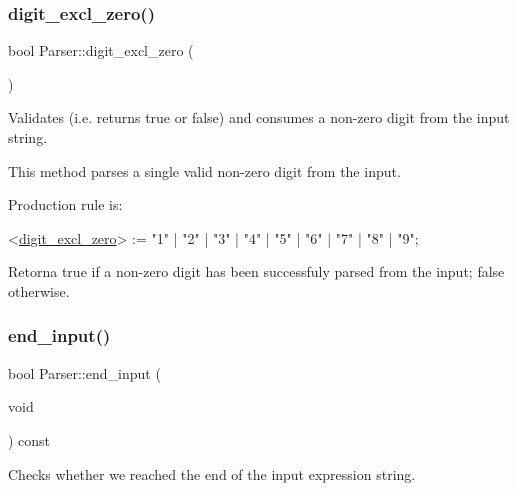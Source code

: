 \subsubsection{\texorpdfstring{digit\+\_\+excl\+\_\+zero()}{digit\_excl\_zero()}}
{\footnotesize\ttfamily bool Parser\+::digit\+\_\+excl\+\_\+zero (\begin{DoxyParamCaption}{ }\end{DoxyParamCaption})\hspace{0.3cm}{\ttfamily [private]}}



Validates (i.\+e. returns true or false) and consumes a non-\/zero digit from the input string. 

This method parses a single valid non-\/zero digit from the input.

Production rule is\+: 
\begin{DoxyCode}
<\hyperlink{classParser_ac1522aacdb7de926636be0ca1067b915}{digit\_excl\_zero}> := \textcolor{stringliteral}{"1"} | \textcolor{stringliteral}{"2"} | \textcolor{stringliteral}{"3"} | \textcolor{stringliteral}{"4"} | \textcolor{stringliteral}{"5"} | \textcolor{stringliteral}{"6"} | \textcolor{stringliteral}{"7"} | \textcolor{stringliteral}{"8"} | \textcolor{stringliteral}{"9"};
\end{DoxyCode}


\begin{DoxyReturn}{Retorna}
true if a non-\/zero digit has been successfuly parsed from the input; false otherwise. 
\end{DoxyReturn}
\mbox{\label{classParser_a0bc1de21b7ed31471b72abb94ab7aba9}} 
\subsubsection{\texorpdfstring{end\+\_\+input()}{end\_input()}}
{\footnotesize\ttfamily bool Parser\+::end\+\_\+input (\begin{DoxyParamCaption}\item[{void}]{ }\end{DoxyParamCaption}) const\hspace{0.3cm}{\ttfamily [private]}}



Checks whether we reached the end of the input expression string. 

\mbox{\label{classParser_ac107d6116db968131021f4e57838b27d}} 
